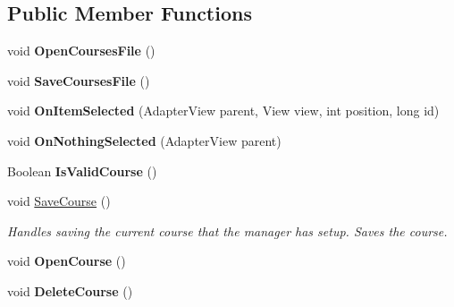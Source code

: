 \subsection*{Public Member Functions}
\begin{DoxyCompactItemize}
\item 
void {\bfseries Open\+Courses\+File} ()\hypertarget{class_w_c_c_mobile_1_1_course_activity_add9cdaf0a170809a3b28ec893e7a6d3e}{}\label{class_w_c_c_mobile_1_1_course_activity_add9cdaf0a170809a3b28ec893e7a6d3e}

\item 
void {\bfseries Save\+Courses\+File} ()\hypertarget{class_w_c_c_mobile_1_1_course_activity_a64742fbf23cc017d0fdcc799858406ab}{}\label{class_w_c_c_mobile_1_1_course_activity_a64742fbf23cc017d0fdcc799858406ab}

\item 
void {\bfseries On\+Item\+Selected} (Adapter\+View parent, View view, int position, long id)\hypertarget{class_w_c_c_mobile_1_1_course_activity_a82383b5b14c39c8db5e35d2d77c32bcb}{}\label{class_w_c_c_mobile_1_1_course_activity_a82383b5b14c39c8db5e35d2d77c32bcb}

\item 
void {\bfseries On\+Nothing\+Selected} (Adapter\+View parent)\hypertarget{class_w_c_c_mobile_1_1_course_activity_afe39bb0b1180a44ec6f399f1b00e84a8}{}\label{class_w_c_c_mobile_1_1_course_activity_afe39bb0b1180a44ec6f399f1b00e84a8}

\item 
Boolean {\bfseries Is\+Valid\+Course} ()\hypertarget{class_w_c_c_mobile_1_1_course_activity_a8ccc690fa9d952d1866bb7ed87289793}{}\label{class_w_c_c_mobile_1_1_course_activity_a8ccc690fa9d952d1866bb7ed87289793}

\item 
void \hyperlink{class_w_c_c_mobile_1_1_course_activity_ac111acfa5c595a939bf2c7fc0ff5e0a6}{Save\+Course} ()
\begin{DoxyCompactList}\small\item\em Handles saving the current course that the manager has setup. Saves the course. \end{DoxyCompactList}\item 
void {\bfseries Open\+Course} ()\hypertarget{class_w_c_c_mobile_1_1_course_activity_af622fc93b9cd46710e3bb2f597b79da1}{}\label{class_w_c_c_mobile_1_1_course_activity_af622fc93b9cd46710e3bb2f597b79da1}

\item 
void {\bfseries Delete\+Course} ()\hypertarget{class_w_c_c_mobile_1_1_course_activity_a7549958d3c3184451bffada965cccb03}{}\label{class_w_c_c_mobile_1_1_course_activity_a7549958d3c3184451bffada965cccb03}


\end{DoxyCompactItemize}
